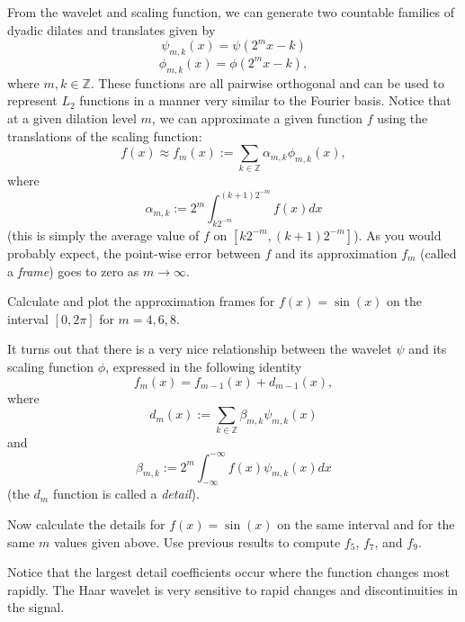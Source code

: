 From the wavelet and scaling function, we can generate two countable families
of dyadic dilates and translates given by
\begin{equation*}
\psi_{m,k}(x) = \psi(2^mx - k)
\end{equation*}
\begin{equation*}
\phi_{m,k}(x) = \phi(2^mx - k),
\end{equation*}
where $m,k \in \mathbb{Z}$. These functions are all pairwise orthogonal and can be used
to represent $L_2$ functions in a manner very similar to the Fourier basis.
Notice that at a given dilation level $m$, we can 
approximate a given function $f$ using the translations of the scaling function:
\begin{equation*}
f(x) \approx f_m(x) := \displaystyle\sum_{k \in \mathbb{Z}}\alpha_{m,k}\phi_{m,k}(x),
\end{equation*}
where
\begin{equation*}
\alpha_{m,k} := 2^m \displaystyle \int_{k2^{-m}}^{(k+1)2^{-m}}f(x) dx
\end{equation*}
(this is simply the average value of $f$ on $[k2^{-m},(k+1)2^{-m}]$). As you would probably
expect, the point-wise error between $f$ and its approximation $f_m$ (called a \emph{frame}) 
goes to zero as
$m \to \infty$.
\begin{problem}
Calculate and plot the approximation frames for $f(x) = \sin(x)$ on the interval $[0,2\pi]$
for $m = 4, 6, 8$.
\end{problem}
It turns out that there is a very nice relationship between the wavelet $\psi$ and its scaling
function $\phi$, expressed in the following identity
\begin{equation*}
f_m(x) = f_{m-1}(x) + d_{m-1}(x),
\end{equation*}
where
\begin{equation*}
d_m(x) := \displaystyle\sum_{k \in \mathbb{Z}}\beta_{m,k}\psi_{m,k}(x)
\end{equation*}
and
\begin{equation*}
\beta_{m,k} := 2^m \displaystyle \int_{-\infty}^{-\infty}f(x) \psi_{m,k}(x) dx
\end{equation*}
(the $d_m$ function is called a \emph{detail}).
\begin{problem}
Now calculate the details for $f(x) = \sin(x)$ on the same interval and for the
same $m$ values given above. Use previous results to compute $f_5$, $f_7$, and $f_9$.
\end{problem}

Notice that the largest detail coefficients occur where the function changes
most rapidly. The Haar wavelet is very sensitive to rapid changes and discontinuities
in the signal. 

